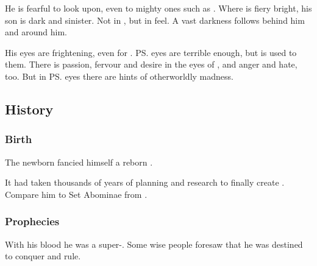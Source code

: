 He is fearful to look upon, even to mighty ones such as \LocarPsyrex. 
Where \Secherdamon is fiery bright, his son \Vizsherioch is dark and sinister. 
Not in \colour, but in feel. 
A vast darkness follows behind him and around him. 

His eyes are frightening, even for \Psyrex. 
\ps{\Secherdamon} eyes are terrible enough, but \Psyrex is used to them. 
There is passion, fervour and desire in the eyes of \Secherdamon, and anger and hate, too. 
But in \ps{\Vizsherioch} eyes there are hints of otherworldly madness. 










\subsection{History}





\subsubsection{Birth}
The newborn \Vizsherioch{} fancied himself a reborn \xs. 


It had taken \Secherdamon{} thousands of years of planning and research to finally create \Vizsherioch. 
Compare him to Set Abominae from \cite{IcedEarth:SomethingWicked}. 





\subsubsection{Prophecies}
With his \bane{} blood he was a super-\dragon. 
Some wise people foresaw that he was destined to conquer and rule. 

